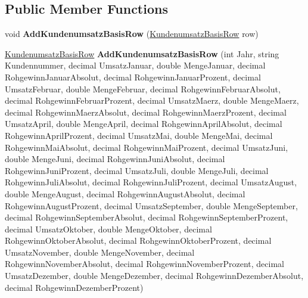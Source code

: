 \subsection*{Public Member Functions}
\begin{DoxyCompactItemize}
\item 
void {\bfseries Add\+Kundenumsatz\+Basis\+Row} (\hyperlink{class_products_1_1_data_1_1ds_sage_1_1_kundenumsatz_basis_row}{Kundenumsatz\+Basis\+Row} row)\hypertarget{class_products_1_1_data_1_1ds_sage_1_1_kundenumsatz_basis_data_table_a19c2b108d47eb1b52ea2796922639038}{}\label{class_products_1_1_data_1_1ds_sage_1_1_kundenumsatz_basis_data_table_a19c2b108d47eb1b52ea2796922639038}

\item 
\hyperlink{class_products_1_1_data_1_1ds_sage_1_1_kundenumsatz_basis_row}{Kundenumsatz\+Basis\+Row} {\bfseries Add\+Kundenumsatz\+Basis\+Row} (int Jahr, string Kundennummer, decimal Umsatz\+Januar, double Menge\+Januar, decimal Rohgewinn\+Januar\+Absolut, decimal Rohgewinn\+Januar\+Prozent, decimal Umsatz\+Februar, double Menge\+Februar, decimal Rohgewinn\+Februar\+Absolut, decimal Rohgewinn\+Februar\+Prozent, decimal Umsatz\+Maerz, double Menge\+Maerz, decimal Rohgewinn\+Maerz\+Absolut, decimal Rohgewinn\+Maerz\+Prozent, decimal Umsatz\+April, double Menge\+April, decimal Rohgewinn\+April\+Absolut, decimal Rohgewinn\+April\+Prozent, decimal Umsatz\+Mai, double Menge\+Mai, decimal Rohgewinn\+Mai\+Absolut, decimal Rohgewinn\+Mai\+Prozent, decimal Umsatz\+Juni, double Menge\+Juni, decimal Rohgewinn\+Juni\+Absolut, decimal Rohgewinn\+Juni\+Prozent, decimal Umsatz\+Juli, double Menge\+Juli, decimal Rohgewinn\+Juli\+Absolut, decimal Rohgewinn\+Juli\+Prozent, decimal Umsatz\+August, double Menge\+August, decimal Rohgewinn\+August\+Absolut, decimal Rohgewinn\+August\+Prozent, decimal Umsatz\+September, double Menge\+September, decimal Rohgewinn\+September\+Absolut, decimal Rohgewinn\+September\+Prozent, decimal Umsatz\+Oktober, double Menge\+Oktober, decimal Rohgewinn\+Oktober\+Absolut, decimal Rohgewinn\+Oktober\+Prozent, decimal Umsatz\+November, double Menge\+November, decimal Rohgewinn\+November\+Absolut, decimal Rohgewinn\+November\+Prozent, decimal Umsatz\+Dezember, double Menge\+Dezember, decimal Rohgewinn\+Dezember\+Absolut, decimal Rohgewinn\+Dezember\+Prozent)\hypertarget{class_products_1_1_data_1_1ds_sage_1_1_kundenumsatz_basis_data_table_a0edf417e774bd46349a4f10c92a166a9}{}\label{class_products_1_1_data_1_1ds_sage_1_1_kundenumsatz_basis_data_table_a0edf417e774bd46349a4f10c92a166a9}


\end{DoxyCompactItemize}
